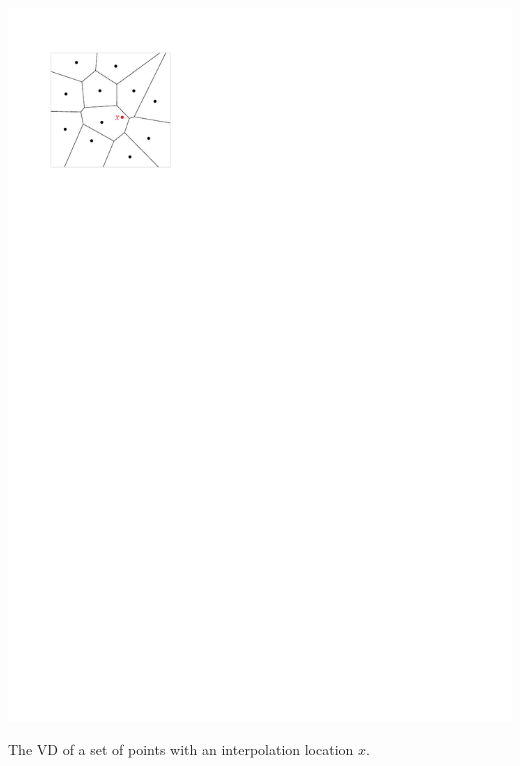 \begin{marginfigure}
  \centering
  \includegraphics[width=\textwidth,page=1]{figs/laplace.pdf}%
  \caption{The VD of a set of points with an interpolation location $x$.}%
\end{marginfigure}
